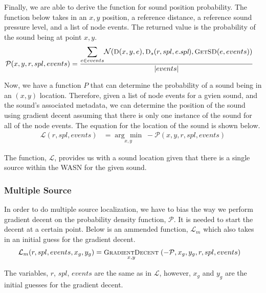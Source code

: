 \documentclass[12pt]{article}
\newcommand{\Normal}[3]{\mathcal{N}(#1, #2, #3)}
\newcommand{\Function}[1]{\ensuremath{{\small \textsc{#1}}}}
\newcommand{\Var}[1]{\ensuremath{{\small{\textsl{#1}}}}}
\newcommand{\argmin}[1]{\underset{#1}{\operatorname{arg}\,\operatorname{min}}\;}
\newcommand{\grad}[1]{\underset{#1}{\operatorname{\Function{GradientDecent}}}\;}
\begin{document}
Finally, we are able to derive the function for sound position probability. The
function below takes in an $x, y$ position, a reference distance, a reference
sound pressure level, and a list of node events. The returned value is the
probability of the sound being at point $x, y$.  \begin{align*} \mathcal{P}(x,
y, r, spl, events) &= \frac{\mathlarger{\sum}_{e \in
events}{\Normal{\Function{D}(x, y, e)}{\Function{D}_{s}(r, spl,
e.\Var{spl})}{\Function{GetSD}(e, events)}}}{|events|} \end{align*}

Now, we have a function $P$ that can determine the probability of a sound being
in an $(x, y)$ location. Therefore, given a list of node events for a gvien
sound, and the sound's associated metadata, we can determine the position of
the sound using gradient decent assuming that there is only one instance of the
sound for all of the node events. The equation for the location of the sound is
shown below. \begin{align*} \mathcal{L}(r, spl, events) &= \argmin{x, y}
-\mathcal{P}(x, y, r, spl, events) \end{align*}

The function, $\mathcal{L}$, provides us with a sound location given that there
is a single source within the WASN for the given sound.

\subsubsection{Multiple Source}

In order to do multiple source localization, we have to bias the way we perform
gradient decent on the probability density function, $\mathcal{P}$. It is
needed to start the decent at a certain point. Below is an ammended function,
$\mathcal{L}_m$ which also takes in an initial guess for the gradient decent.
\begin{align*} \mathcal{L}_m(r, spl, events, x_g, y_g) &=
\grad{x, y}(\mathcal{-P}, x_g, y_g, r, spl, events) \end{align*}

The variables, $r$, $spl$, $events$ are the same as in $\mathcal{L}$, however,
$x_g$ and $y_g$ are the initial guesses for the gradient decent.
\end{document}
